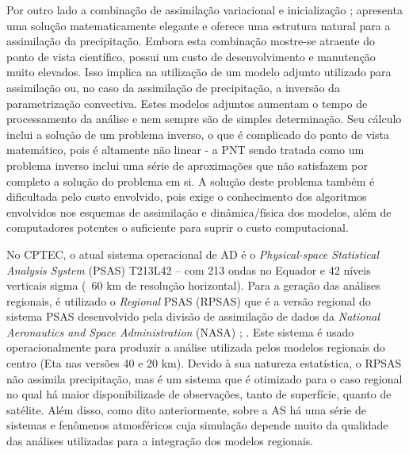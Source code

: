 Por outro lado a combinação de assimilação variacional e inicialização \cite{zupanskimesinger95}; \cite{treadon96} apresenta uma solução matematicamente elegante e oferece uma estrutura natural para a assimilação da precipitação. Embora esta combinação mostre-se atraente do ponto de vista científico, possui um custo de desenvolvimento e manutenção muito elevados. Isso implica na utilização de um modelo adjunto utilizado para assimilação ou, no caso da assimilação de precipitação, a inversão da parametrização convectiva. Estes modelos adjuntos aumentam o tempo de processamento da análise e nem sempre são de simples determinação. Seu cálculo inclui a solução de um problema inverso, o que é complicado do ponto de vista matemático, pois é altamente não linear - a  PNT sendo tratada como um problema inverso inclui uma série de aproximações que não satisfazem por completo a solução do problema em si. A solução deste problema também é dificultada pelo custo envolvido, pois exige o conhecimento dos algoritmos envolvidos nos esquemas de assimilação e dinâmica/física dos modelos, além de computadores potentes o suficiente para suprir o custo computacional.

No CPTEC, o atual sistema operacional de AD é o \textit{Physical-space Statistical Analysis System} (PSAS) T213L42 – com 213 ondas no Equador e 42 níveis verticais sigma (~60 km de resolução horizontal). Para a geração das análises regionais, é utilizado o \textit{Regional} PSAS (RPSAS) que é a versão regional do sistema PSAS desenvolvido pela divisão de assimilação de dados da \textit{National Aeronautics and Space Administration} (NASA) \cite{dasilvaetal95}; \cite{courtier97}. Este sistema é usado operacionalmente para produzir a análise utilizada pelos modelos regionais do centro (Eta nas versões 40 e 20 km). Devido à sua natureza estatística, o RPSAS não assimila precipitação, mas é um sistema que é otimizado para o caso regional no qual há maior disponibilizade de observações, tanto de superfície, quanto de satélite. Além disso, como dito anteriormente, sobre a AS há uma série de sistemas e fenômenos atmosféricos cuja simulação depende muito da qualidade das análises utilizadas para a integração dos modelos regionais.

